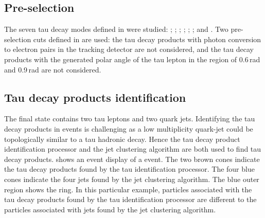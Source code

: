 \subsection{Pre-selection}

The seven tau decay modes defined in  were studied: \tauToElectron; \tauToMuon; \tauToPion; \tauToRho; \tauToAiPhoton; \tauToAiPion; and \tauToThreePion. Two pre-selection cuts defined in  are used: the tau decay products with photon conversion to electron pairs in the tracking detector are not considered, and the tau decay products with the generated polar angle of the tau lepton in the region of 0.6\,rad and 0.9\,rad are not considered.

\subsection{Tau decay products identification}
\label{sec:tauHZfindTau}

The \eeZZQQ final state contains two tau leptons and two quark jets. Identifying the tau decay products in \eeZZQQ events is challenging as a low multiplicity quark-jet could be topologically similar  to a tau hadronic decay. Hence the tau decay product identification processor and the jet clustering algorithm are both used to find tau decay products.  shows an event display of a \eeZZQQ event. The two brown cones indicate the tau decay products found by the tau identification processor. The four blue cones indicate the four jets found by the jet clustering algorithm. The blue outer region shows the \HCAL ring. In this particular example, particles associated with the tau decay products found by the tau identification processor are different to the particles associated with jets found by the jet clustering algorithm.




